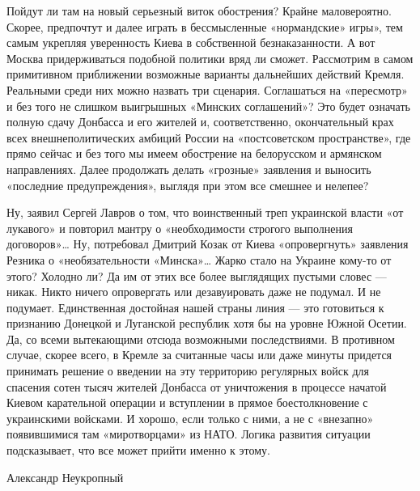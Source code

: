 Пойдут ли там на новый серьезный виток обострения? Крайне маловероятно. Скорее,
предпочтут и далее играть в бессмысленные «нормандские» игры», тем самым
укрепляя уверенность Киева в собственной безнаказанности. А вот Москва
придерживаться подобной политики вряд ли сможет. Рассмотрим в самом примитивном
приближении возможные варианты дальнейших действий Кремля. Реальными среди них
можно назвать три сценария. Соглашаться на «пересмотр» и без того не слишком
выигрышных «Минских соглашений»? Это будет означать полную сдачу Донбасса и его
жителей и, соответственно, окончательный крах всех внешнеполитических амбиций
России на «постсоветском пространстве», где прямо сейчас и без того мы имеем
обострение на белорусском и армянском направлениях. Далее продолжать делать
«грозные» заявления и выносить «последние предупреждения», выглядя при этом все
смешнее и нелепее?

Ну, заявил Сергей Лавров о том, что воинственный треп украинской власти «от
лукавого» и повторил мантру о «необходимости строгого выполнения договоров»…
Ну, потребовал Дмитрий Козак от Киева «опровергнуть» заявления Резника о
«необязательности «Минска»… Жарко стало на Украине кому-то от этого? Холодно
ли? Да им от этих все более выглядящих пустыми словес --- никак. Никто ничего
опровергать или дезавуировать даже не подумал. И не подумает. Единственная
достойная нашей страны линия --- это готовиться к признанию Донецкой и Луганской
республик хотя бы на уровне Южной Осетии. Да, со всеми вытекающими отсюда
возможными последствиями. В противном случае, скорее всего, в Кремле за
считанные часы или даже минуты придется принимать решение о введении на эту
территорию регулярных войск для спасения сотен тысяч жителей Донбасса от
уничтожения в процессе начатой Киевом карательной операции и вступлении в
прямое боестолкновение с украинскими войсками. И хорошо, если только с ними, а
не с «внезапно» появившимися там «миротворцами» из НАТО. Логика развития
ситуации подсказывает, что все может прийти именно к этому.

Александр Неукропный
  
